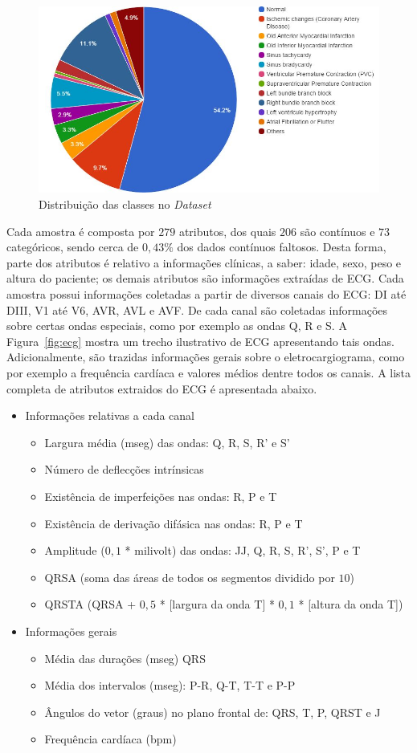 \documentclass[12pt]{article}
\begin{document}
\begin{figure}[ht]
\centering
\includegraphics[width=.8\textwidth]{distribuicao.png}
\caption{Distribuição das classes no \emph{Dataset}}
\label{fig:distribuicao}
\end{figure}

Cada amostra é composta por $279$ atributos, dos quais $206$ são contínuos e $73$ categóricos, sendo cerca de $0,43\%$ dos dados contínuos faltosos. Desta forma, parte dos atributos é relativo a informações clínicas, a saber: idade, sexo, peso e altura do paciente; os demais atributos são informações extraídas de ECG. Cada amostra possui informações coletadas a partir de diversos canais do ECG: DI até DIII, V1 até V6, AVR, AVL e AVF. De cada canal são coletadas informações sobre certas ondas especiais, como por exemplo as ondas Q, R e S. A Figura~\ref{fig:ecg} mostra um trecho ilustrativo de ECG apresentando tais ondas. Adicionalmente, são trazidas informações gerais sobre o eletrocargiograma, como por exemplo a frequência cardíaca e valores médios dentre todos os canais. A lista completa de atributos extraidos do ECG é apresentada abaixo.


\begin{itemize}
 \item Informações relativas a cada canal
 \begin{itemize}
  \item Largura média (mseg) das ondas: Q, R, S, R' e S'
  \item Número de deflecções intrínsicas
  \item Existência de imperfeições nas ondas: R, P e T
  \item Existência de derivação difásica nas ondas: R, P e T
  \item Amplitude ($0,1$ * milivolt) das ondas: JJ, Q, R, S, R', S', P e T
  \item QRSA (soma das áreas de todos os segmentos dividido por $10$)
  \item QRSTA (QRSA + $0,5$ * [largura da onda T] * $0,1$ * [altura da onda T])
 \end{itemize}
 \item Informações gerais
 \begin{itemize}
  \item Média das durações (mseg) QRS 
  \item Média dos intervalos (mseg): P-R, Q-T, T-T e P-P
  \item Ângulos do vetor (graus) no plano frontal de: QRS, T, P, QRST e J
  \item Frequência cardíaca (bpm)
 \end{itemize}
\end{itemize}
\end{document}
